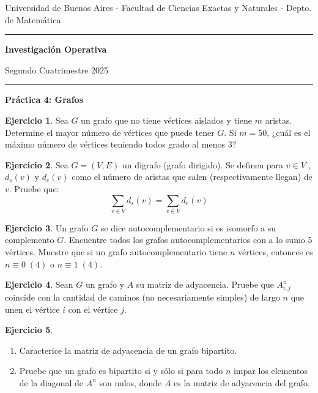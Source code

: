 \documentclass[12pt]{article}
\theoremstyle{definition}
\newtheorem{ejer}{Ejercicio}
\newcommand{\bej}{\begin{ejer}}
\newcommand{\fej}{\end{ejer}}
\begin{document}

\centerline{{\small Universidad de Buenos Aires - Facultad de Ciencias Exactas y Naturales - Depto. de Matemática}}

\vskip 0.2cm

\hrule

\vskip 0.2cm

 \centerline{{\bf\Large{\sc Investigación Operativa}}}

 \vskip 0.2cm

 \centerline{\ttfamily Segundo Cuatrimestre 2025}

\vskip 0.2cm

 \hrule

 \bigskip
 \centerline{\bf Práctica 4: Grafos}
 \bigskip

\bej
Sea $G$ un grafo que no tiene vértices aislados y tiene $m$ aristas. Determine el mayor número de vértices que puede tener $G$. Si $m = 50$, ¿cuál es el máximo número de vértices teniendo todos grado al menos $3$?
\fej

\bej
Sea $G = (V, E)$ un digrafo (grafo dirigido). Se definen para $v \in V$ , $d_s(v)$ y $d_e(v)$ como el número de aristas que salen (respectivamente llegan) de $v$. Pruebe que:
\[ \sum_{v\in V} d_s(v) = \sum_{v\in V} d_e(v)\]
\fej

\bej
Un grafo $G$ se dice autocomplementario si es isomorfo a su complemento $G$. Encuentre todos los grafos autocomplementarios con a lo sumo 5 vértices. Muestre que si un grafo autocomplementario tiene $n$ vértices, entonces es $n \equiv 0 \;(4)$ o $ n \equiv 1 \;(4)$.
\fej

\bej
Sean $G$ un grafo y $A$ su matriz de adyacencia. Pruebe que $A^n_{
i,j}$ coincide con la cantidad de
caminos (no necesariamente simples) de largo $n$ que unen el vértice $i$ con el vértice $j$.
\fej


\bej
\hspace{1em}

\begin{enumerate}
    \item Caracterice la matriz de adyacencia de un grafo bipartito.
    \item Pruebe que un grafo es bipartito si y sólo si para todo $n$ impar los elementos de la diagonal de $A^n$ son nulos, donde $A$ es la matriz de adyacencia del grafo.
\end{enumerate}
\fej
\end{document}
